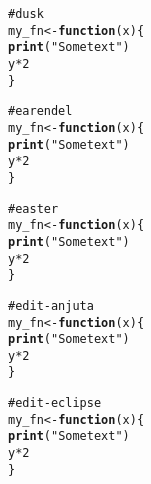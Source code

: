 \documentclass[12pt]{article}\usepackage{graphicx, color}
\makeatletter
\newcommand{\hlfunctioncall}[1]{\textcolor[rgb]{0.188235294117647,0.650980392156863,0.188235294117647}{\textbf{#1}}}%
\newcommand{\hlstring}[1]{\textcolor[rgb]{0.850980392156863,1,0.466666666666667}{#1}}%
\newcommand{\hlcomment}[1]{\textcolor[rgb]{0.533333333333333,0.533333333333333,0.533333333333333}{#1}}%
\newenvironment{kframe}{%
 \def\at@end@of@kframe{}%
 \ifinner\ifhmode%
  \def\at@end@of@kframe{\end{minipage}}%
  \begin{minipage}{\columnwidth}%
 \fi\fi%
 \def\FrameCommand##1{\hskip\@totalleftmargin \hskip-\fboxsep
 \colorbox{shadecolor}{##1}\hskip-\fboxsep
     \hskip-\linewidth \hskip-\@totalleftmargin \hskip\columnwidth}%
 \MakeFramed {\advance\hsize-\width
   \@totalleftmargin\z@ \linewidth\hsize
   \@setminipage}}%
 {\par\unskip\endMakeFramed%
 \at@end@of@kframe}
\newenvironment{knitrout}{}{} %
\makeatother
\begin{document}
\begin{knitrout}
\color{fgcolor}\begin{kframe}
\begin{alltt}
\hlcomment{# dusk}
my_fn <- \hlfunctioncall{function}(x) \{
    \hlfunctioncall{print}(\hlstring{"Some text"})
    y * 2
\}
\end{alltt}
\end{kframe}
\end{knitrout}





\begin{knitrout}
\color{fgcolor}\begin{kframe}
\begin{alltt}
\hlcomment{# earendel}
my_fn <- \hlfunctioncall{function}(x) \{
    \hlfunctioncall{print}(\hlstring{"Some text"})
    y * 2
\}
\end{alltt}
\end{kframe}
\end{knitrout}





\begin{knitrout}
\color{fgcolor}\begin{kframe}
\begin{alltt}
\hlcomment{# easter}
my_fn <- \hlfunctioncall{function}(x) \{
    \hlfunctioncall{print}(\hlstring{"Some text"})
    y * 2
\}
\end{alltt}
\end{kframe}
\end{knitrout}





\begin{knitrout}
\color{fgcolor}\begin{kframe}
\begin{alltt}
\hlcomment{# edit-anjuta}
my_fn <- \hlfunctioncall{function}(x) \{
    \hlfunctioncall{print}(\hlstring{"Some text"})
    y * 2
\}
\end{alltt}
\end{kframe}
\end{knitrout}





\begin{knitrout}
\color{fgcolor}\begin{kframe}
\begin{alltt}
\hlcomment{# edit-eclipse}
my_fn <- \hlfunctioncall{function}(x) \{
    \hlfunctioncall{print}(\hlstring{"Some text"})
    y * 2
\}
\end{alltt}
\end{kframe}
\end{knitrout}
\end{document}
